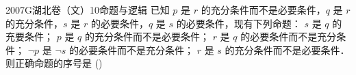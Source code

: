 
\begin{problem}{2007}{G}{湖北卷（文）}{10}{命题与逻辑}
已知 $ p $ 是 $ r $ 的充分条件而不是必要条件，$ q $ 是 $ r $ 的充分条件，$ s $ 是 $ r $ 的必要条件，$ q $ 是 $ s $ 的必要条件，现有下列命题：  
 $ s $ 是 $ q $ 的充要条件；  
 $ p $ 是 $ q $ 的充分条件而不是必要条件；  
 $ r $ 是 $ q $ 的必要条件而不是充分条件；  
 $ \neg p $ 是 $ \neg s $ 的必要条件而不是充分条件；  
 $ r $ 是 $ s $ 的充分条件而不是必要条件．  
则正确命题的序号是 (\hspace{1cm})
\begin{choices}
\end{choices}
\end{problem}

\begin{answer}

\end{answer}

\begin{solutions}

\end{solutions}